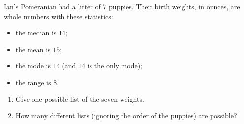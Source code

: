 Ian's Pomeranian had a litter of $7$ puppies. Their birth weights, in ounces, are whole numbers with these statistics:
\begin{itemize}
\item the median is $14$;
\item the mean is $15$;
\item the mode is $14$ (and $14$ is the only mode);
\item the range is $8$.
\end{itemize}
\begin{enumerate}
\item[(a)] Give one possible list of the seven weights.
\item[(b)] How many different lists (ignoring the order of the puppies) are possible?
\end{enumerate}
